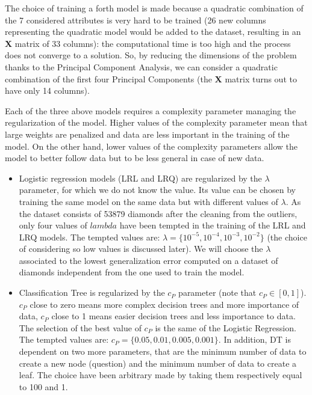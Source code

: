 \documentclass[
]{article}
\providecommand{\tightlist}{%
  \setlength{\itemsep}{0pt}\setlength{\parskip}{0pt}}
\begin{document}
The choice of training a forth model is made because a quadratic
combination of the 7 considered attributes is very hard to be trained
(26 new columns representing the quadratic model would be added to the
dataset, resulting in an \textbf{X} matrix of 33 columns): the
computational time is too high and the process does not converge to a
solution. So, by reducing the dimensions of the problem thanks to the
Principal Component Analysis, we can consider a quadratic combination of
the first four Principal Components (the \textbf{X} matrix turns out to
have only 14 columns).

Each of the three above models requires a complexity parameter managing
the regularization of the model. Higher values of the complexity
parameter mean that large weights are penalized and data are less
important in the training of the model. On the other hand, lower values
of the complexity parameters allow the model to better follow data but
to be less general in case of new data.

\begin{itemize}
\tightlist
\item
  Logistic regression models (LRL and LRQ) are regularized by the
  \(\lambda\) parameter, for which we do not know the value. Its value
  can be chosen by training the same model on the same data but with
  different values of \(\lambda\). As the dataset consists of 53879
  diamonds after the cleaning from the outliers, only four values of
  \(lambda\) have been tempted in the training of the LRL and LRQ
  models. The tempted values are:
  \(\lambda=\{10^{-5},10^{-4},10^{-3},10^{-2}\}\) (the choice of
  considering so low values is discussed later). We will choose the
  \(\lambda\) associated to the lowest generalization error computed on
  a dataset of diamonds independent from the one used to train the
  model.
\item
  Classification Tree is regularized by the \(c_P\) parameter (note that
  \(c_P\in[0,1]\)). \(c_P\) close to zero means more complex decision
  trees and more importance of data, \(c_P\) close to 1 means easier
  decision trees and less importance to data. The selection of the best
  value of \(c_P\) is the same of the Logistic Regression. The tempted
  values are: \(c_P=\{0.05,0.01,0.005,0.001\}\). In addition, DT is
  dependent on two more parameters, that are the minimum number of data
  to create a new node (question) and the minimum number of data to
  create a leaf. The choice have been arbitrary made by taking them
  respectively equal to 100 and 1.
\end{itemize}
\end{document}
